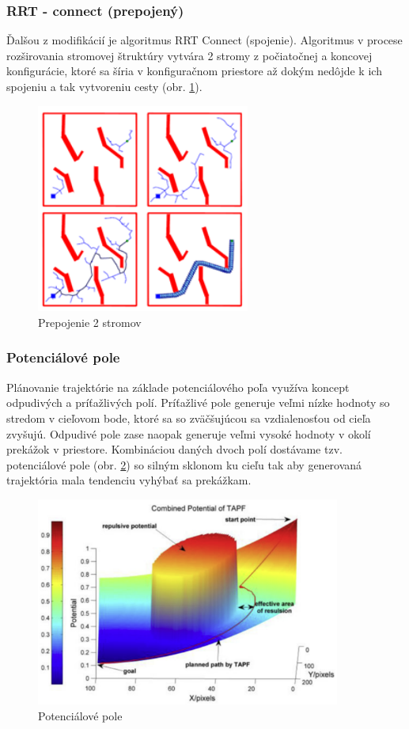 \subsubsection{RRT - connect (prepojený)}
\label{kap:1.2.3}
Ďalšou z modifikácií je algoritmus RRT Connect (spojenie). Algoritmus v procese rozširovania stromovej štruktúry vytvára 2 stromy z počiatočnej a koncovej konfigurácie, ktoré sa šíria v konfiguračnom priestore až dokým nedôjde k ich spojeniu a tak vytvoreniu cesty (obr. \ref{OBRAZOK 1.2.3}).

\begin{figure}[h]
	\centering
	\includegraphics[width=70mm]{img/RRT-connect.png}
	\caption{Prepojenie 2 stromov \cite{}}\label{OBRAZOK 1.2.3} 
\end{figure} 

\subsubsection{Potenciálové pole}
\label{kap:1.2.4}

Plánovanie trajektórie na základe potenciálového poľa využíva koncept odpudivých a príťažlivých polí. Príťažlivé pole generuje veľmi nízke hodnoty so stredom v cieľovom bode, ktoré sa so zväčšujúcou sa vzdialenosťou od cieľa zvyšujú. Odpudivé pole zase naopak generuje veľmi vysoké hodnoty v okolí prekážok v priestore. Kombináciou daných dvoch polí dostávame tzv. potenciálové pole (obr. \ref{OBRAZOK 1.2.4}) so silným sklonom ku cieľu tak aby generovaná trajektória mala tendenciu vyhýbať sa prekážkam.

\begin{figure}[h]
	\centering
	\includegraphics[width=100mm]{img/Potencialove_pole2.png}
	\caption{Potenciálové pole \cite{}}\label{OBRAZOK 1.2.4} 
\end{figure} 